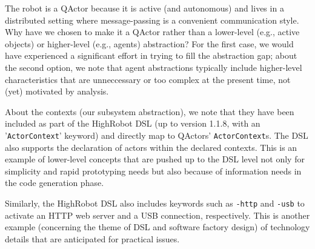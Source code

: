 \documentclass[11pt]{article}
\newcommand{\blue}[1]{{\color{blue}#1}}
\newcommand{\quindi}[1]{\blue{\emph{$\Rightarrow$ #1}}}
\begin{document}
  The robot is a QActor because it is active (and autonomous) and lives in a
  distributed setting where message-passing is a convenient communication style.
  Why have we chosen to make it a QActor rather than a lower-level (e.g.,
  active objects) or higher-level (e.g., agents) abstraction?
  For the first case, we would have experienced a significant effort in trying
  to fill the abstraction gap; about the second option, we note that 
  agent abstractions typically include higher-level characteristics that 
  are unneccessary or too complex at the present time, not (yet) motivated by
  analysis.
  
  About the contexts (our subsystem abstraction), we note that they have been 
   included as part of the HighRobot DSL (up to version 1.1.8, with an
   '\texttt{ActorContext}' keyword) and directly map to QActors'
   \texttt{ActorContext}s. The DSL also supports the declaration of actors
   within the declared contexts. This is an example of lower-level concepts 
   that are pushed up to the DSL level not only for simplicity and rapid
   prototyping needs but also because of information needs in the 
   code generation phase.

 Similarly, the HighRobot DSL also includes keywords such as \texttt{-http} and
 \texttt{-usb} to activate an HTTP web server and a USB connection,
 respectively. This is another example (concerning the theme of DSL and
 software factory design) of technology details that are anticipated for
 practical issues.
   
 



  
  
  
\end{document}
